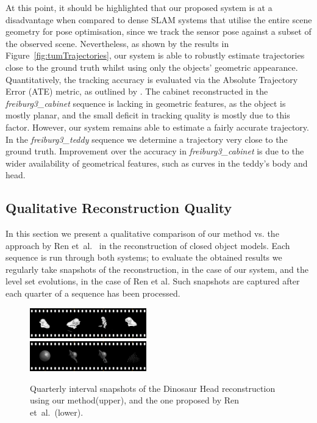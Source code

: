 At this point, it should be highlighted that our proposed system is at a disadvantage when compared to dense SLAM systems that utilise the entire scene geometry for pose optimisation, since we track the sensor pose against a subset of the observed scene.
Nevertheless, as shown by the results in Figure~\ref{fig:tumTrajectories}, our system is able to robustly estimate trajectories close to the ground truth whilst using only the objects' geometric appearance.
Quantitatively, the tracking accuracy is evaluated via the Absolute Trajectory Error (ATE) metric, as outlined by \cite{sturm12iros}.
The cabinet reconstructed in the \textit{freiburg3\_cabinet} sequence is lacking in geometric features, as the object is mostly planar,
and the small deficit in tracking quality is mostly due to this factor.
However, our system remains able to estimate a fairly accurate trajectory. 
In the \textit{freiburg3\_teddy} sequence we determine a trajectory very close to the ground truth.
Improvement over the accuracy in \textit{freiburg3\_cabinet} is due to the wider availability of geometrical features, such as curves in the teddy's body and head.

\subsection{Qualitative Reconstruction Quality}
In this section we present a qualitative comparison of our method vs. the approach by Ren et~al.~\cite{Ren2013} in the reconstruction of closed object models. %
Each sequence is run through both systems; to evaluate the obtained results we regularly take snapshots of the reconstruction, in the case of our system, and the level set evolutions, in the case of Ren et al.
Such snapshots are captured after each quarter of a sequence has been processed. %

\begin{figure}[!t]
	\centering
		\includegraphics[width=0.45\textwidth]{filmstrips/dino.png} \\
		\includegraphics[width=0.45\textwidth]{filmstrips/dino_s3d_large.png}
	\caption{
        Quarterly interval snapshots of the Dinosaur Head reconstruction using our method(upper), and the one proposed by Ren et~al.~\cite{Ren2013}(lower).
	}
	\label{fig:dinoComparison}
\end{figure}

